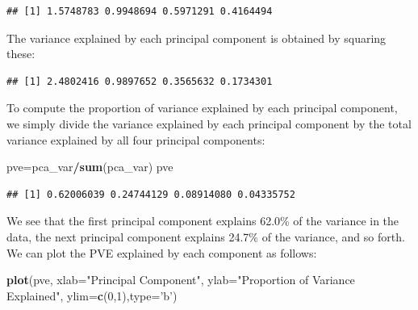 \documentclass[openany]{book}
\newenvironment{Shaded}{\begin{snugshade}}{\end{snugshade}}
\newcommand{\DataTypeTok}[1]{\textcolor[rgb]{0.13,0.29,0.53}{#1}}
\newcommand{\DecValTok}[1]{\textcolor[rgb]{0.00,0.00,0.81}{#1}}
\newcommand{\KeywordTok}[1]{\textcolor[rgb]{0.13,0.29,0.53}{\textbf{#1}}}
\newcommand{\NormalTok}[1]{#1}
\newcommand{\OperatorTok}[1]{\textcolor[rgb]{0.81,0.36,0.00}{\textbf{#1}}}
\newcommand{\StringTok}[1]{\textcolor[rgb]{0.31,0.60,0.02}{#1}}
\begin{document}
\begin{Shaded}
\end{Shaded}

\begin{verbatim}
## [1] 1.5748783 0.9948694 0.5971291 0.4164494
\end{verbatim}

The variance explained by each principal component is obtained by squaring
these:

\begin{Shaded}
\end{Shaded}

\begin{verbatim}
## [1] 2.4802416 0.9897652 0.3565632 0.1734301
\end{verbatim}

To compute the proportion of variance explained by each principal component,
we simply divide the variance explained by each principal component
by the total variance explained by all four principal components:

\begin{Shaded}
\begin{Highlighting}[]
\NormalTok{pve=pca_var}\OperatorTok{/}\KeywordTok{sum}\NormalTok{(pca_var)}
\NormalTok{pve}
\end{Highlighting}
\end{Shaded}

\begin{verbatim}
## [1] 0.62006039 0.24744129 0.08914080 0.04335752
\end{verbatim}

We see that the first principal component explains 62.0\% of the variance
in the data, the next principal component explains 24.7\% of the variance,
and so forth. We can plot the PVE explained by each component as follows:

\begin{Shaded}
\begin{Highlighting}[]
\KeywordTok{plot}\NormalTok{(pve, }\DataTypeTok{xlab=}\StringTok{"Principal Component"}\NormalTok{, }\DataTypeTok{ylab=}\StringTok{"Proportion of Variance Explained"}\NormalTok{, }\DataTypeTok{ylim=}\KeywordTok{c}\NormalTok{(}\DecValTok{0}\NormalTok{,}\DecValTok{1}\NormalTok{),}\DataTypeTok{type=}\StringTok{'b'}\NormalTok{)}
\end{Highlighting}
\end{Shaded}
\end{document}
